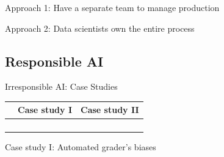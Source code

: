\begin{frame}{Approach 1: Have a separate team to manage production}
  \begin{sidebody}
  \end{sidebody}
\end{frame}

\begin{frame}{Approach 2: Data scientists own the entire process}
  \begin{withmargin}
    \begin{tdmain}
    \end{tdmain}
    \begin{tdmargin}
    \end{tdmargin}
  \end{withmargin}
\end{frame}

\subsection{Responsible AI}

\begin{frame}{Irresponsible AI: Case Studies}
  \footnotesize
  \renewcommand{\arraystretch}{1.35}
  \begin{tabular}{@{}%
    >{\raggedright\arraybackslash}p{}%
    >{\raggedright\arraybackslash}p{}%
    >{\raggedright\arraybackslash}p{}@{}}
    \toprule
     & \textbf{Case study I} & \textbf{Case study II}\\
    \midrule
     & & \\
     & & \\
     & & \\
     & & \\
    \bottomrule
  \end{tabular}
\end{frame}

\begin{frame}{Case study I: Automated grader's biases}
  \begin{withmargin}
    \begin{tdmain}
    \end{tdmain}
    \begin{tdmargin}
    \end{tdmargin}
  \end{withmargin}
\end{frame}

